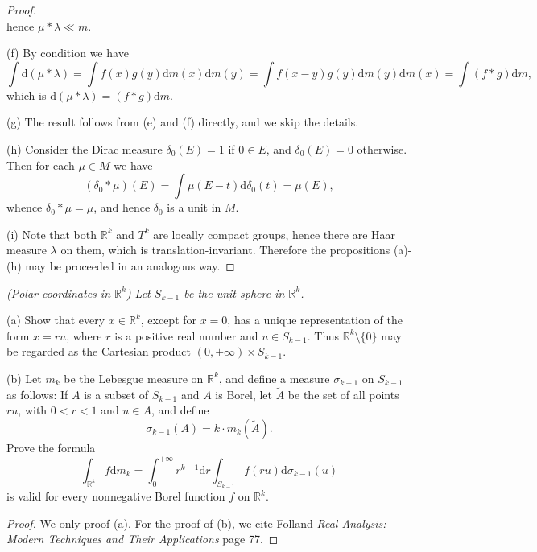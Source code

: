 \begin{proof}
$$$$
hence $\mu*\lambda\ll m$.\par
(f) By condition we have 
$$
\int{\mathrm{d}\left( \mu *\lambda \right)}=\int{f\left( x \right) g\left( y \right) \mathrm{d}m\left( x \right) \mathrm{d}m\left( y \right)}=\int{f\left( x-y \right) g\left( y \right) \mathrm{d}m\left( y \right) \mathrm{d}m\left( x \right)}=\int{\left( f*g \right) \mathrm{d}m},
$$
which is $\mathrm{d}(\mu*\lambda)=(f*g)\mathrm{d}m$.\par
(g) The result follows from (e) and (f) directly, and we skip the details.\par
(h) Consider the Dirac measure $\delta_0(E)=1$ if $0\in E$, and $\delta_0(E)=0$ otherwise. Then for each $\mu\in M$ we have 
$$
\left( \delta _0*\mu \right) \left( E \right) =\int{\mu \left( E-t \right) \mathrm{d}\delta _0\left( t \right)}=\mu \left( E \right) ,
$$
whence $\delta_0*\mu=\mu$, and hence $\delta_0$ is a unit in $M$.\par
(i) Note that both $\mathbb{R}^k$ and $T^k$ are locally compact groups, hence there are Haar measure $\lambda$ on them, which is translation-invariant. Therefore the propositions (a)-(h) may be proceeded in an analogous way.
\end{proof}
\begin{problem}\em
(Polar coordinates in $\mathbb{R}^k$) Let $S_{k-1}$ be the unit sphere in $\mathbb{R}^k$.\par
(a) Show that every $x\in\mathbb{R}^k$, except for $x=0$, has a unique representation of the form $x=ru$, where $r$ is a positive real number and $u\in S_{k-1}$. Thus $\mathbb{R}^k\setminus\{0\}$ may be regarded as the Cartesian product $(0,+\infty)\times S_{k-1}$.\par
(b) Let $m_k$ be the Lebesgue measure on $\mathbb{R}^k$, and define a measure $\sigma_{k-1}$ on $S_{k-1}$ as follows: If $A$ is a subset of $S_{k-1}$ and $A$ is Borel, let $\widetilde{A}$ be the set of all points $ru$, with $0<r<1$ and $u\in A$, and define 
$$
\sigma _{k-1}\left( A \right) =k\cdot m_k\left( \widetilde{A} \right) .
$$
Prove the formula 
$$
\int_{\mathbb{R} ^k}{f\mathrm{d}m_k}=\int_0^{\mathrm{+}\infty}{r^{k-1}\mathrm{d}r\int_{S_{k-1}}{f\left( ru \right) \mathrm{d}\sigma _{k-1}\left( u \right)}}
$$
is valid for every nonnegative Borel function $f$ on $\mathbb{R}^k$.
\end{problem}
\begin{proof}
We only proof (a). For the proof of (b), we cite Folland \textit{Real Analysis: Modern Techniques and Their Applications} page 77.
\end{proof}
